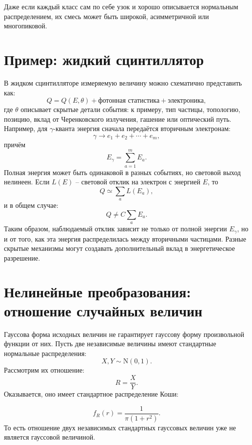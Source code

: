 \documentclass[
  russian,
  12pt,
  a4paper,
  a4paper,
  openany]{scrbook}
\begin{document}
Даже если каждый класс сам по себе узок и хорошо описывается нормальным
распределением, их смесь может быть широкой, асимметричной или
многопиковой.

\section{Пример: жидкий
сцинтиллятор}\label{ux43fux440ux438ux43cux435ux440-ux436ux438ux434ux43aux438ux439-ux441ux446ux438ux43dux442ux438ux43bux43bux44fux442ux43eux440}

В жидком сцинтилляторе измеряемую величину можно схематично представить
как: \[Q
=
Q(E,\theta)
+
\text{фотонная статистика}
+
\text{электроника},\] где \(\theta\) описывает скрытые детали события: к
примеру, тип частицы, топологию, позицию, вклад от Черенковского
излучения, гашение или оптический путь. Например, для \(\gamma\)-кванта
энергия сначала передаётся вторичным электронам:
\[\gamma\to e_1+e_2+\cdots+e_m,\] причём \[E_\gamma=\sum_{a=1}^{m}E_a.\]
Полная энергия может быть одинаковой в разных событиях, но световой
выход нелинеен. Если \(L(E)\) -- световой отклик на электрон с энергией
\(E\), то \[Q\simeq\sum_a L(E_a),\] и в общем случае: \[\boxed{
Q\ne C\sum_aE_a.
}\] Таким образом, наблюдаемый отклик зависит не только от полной
энергии \(E_\gamma\), но и от того, как эта энергия распределилась между
вторичными частицами. Разные скрытые механизмы могут создавать
дополнительный вклад в энергетическое разрешение.

\section{Нелинейные преобразования: отношение случайных
величин}\label{ux43dux435ux43bux438ux43dux435ux439ux43dux44bux435-ux43fux440ux435ux43eux431ux440ux430ux437ux43eux432ux430ux43dux438ux44f-ux43eux442ux43dux43eux448ux435ux43dux438ux435-ux441ux43bux443ux447ux430ux439ux43dux44bux445-ux432ux435ux43bux438ux447ux438ux43d}

Гауссова форма исходных величин не гарантирует гауссову форму
произвольной функции от них. Пусть две независимые величины имеют
стандартные нормальные распределения: \[X,Y\sim\mathrm{N}(0,1).\]
Рассмотрим их отношение: \[R=\frac{X}{Y}.\] Оказывается, оно имеет
стандартное распределение Коши:

\begin{booknote}

\[\boxed{
f_R(r)=\frac{1}{\pi(1+r^2)}.}\] То есть отношение двух независимых
стандартных гауссовых величин уже не является гауссовой величиной.

\end{booknote}
\end{document}
